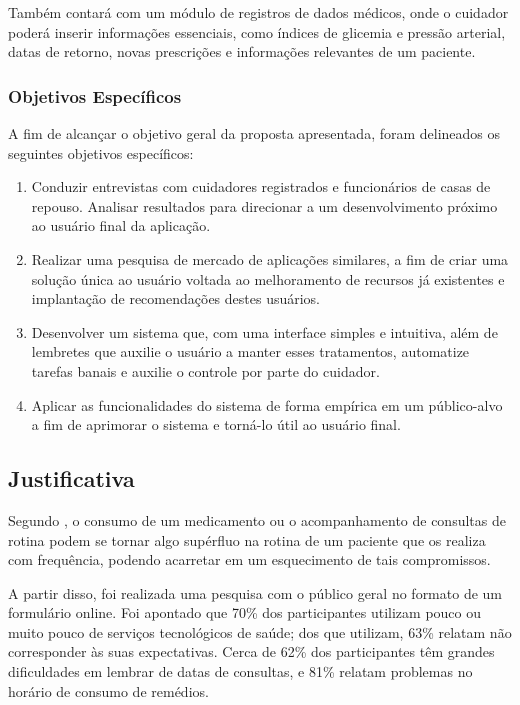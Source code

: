 \documentclass[
	article,			%
	12pt,				%
	oneside,			%
	a4paper,			%
    BIBLATEX,           %
	english,			%
	brazil,				%
	sumario=tradicional
	]{abntex2}
\begin{document}
Também contará com um módulo de registros de dados médicos, onde o cuidador poderá inserir informações essenciais, como índices de glicemia e pressão arterial, datas de retorno, novas prescrições e informações relevantes de um paciente.

\subsubsection{Objetivos Específicos}

A fim de alcançar o objetivo geral da proposta apresentada, foram delineados os seguintes objetivos específicos:

\begin{enumerate}
    \item Conduzir entrevistas com cuidadores registrados e funcionários de casas de repouso. Analisar resultados para direcionar a um desenvolvimento próximo ao usuário final da aplicação.
    \item Realizar uma pesquisa de mercado de aplicações similares, a fim de criar uma solução única ao usuário voltada ao melhoramento de recursos já existentes e implantação de recomendações destes usuários. 
    \item Desenvolver um sistema que, com uma interface simples e intuitiva, além de lembretes que auxilie o usuário a manter esses tratamentos, automatize tarefas banais e auxilie o controle por parte do cuidador.
    \item Aplicar as funcionalidades do sistema de forma empírica em um público-alvo a fim de aprimorar o sistema e torná-lo útil ao usuário final.
\end{enumerate}


\subsection{Justificativa}    

Segundo , o consumo de um medicamento ou o acompanhamento de consultas de rotina podem se tornar algo supérfluo na rotina de um paciente que os realiza com frequência, podendo acarretar em um esquecimento de tais compromissos. 

A partir disso, foi realizada uma pesquisa com o público geral no formato de um formulário online. Foi apontado que 70\% dos participantes utilizam pouco ou muito pouco de serviços tecnológicos de saúde; dos que utilizam, 63\% relatam não corresponder às suas expectativas. Cerca de 62\% dos participantes têm grandes dificuldades em lembrar de datas de consultas, e 81\% relatam problemas no horário de consumo de remédios.
\end{document}
